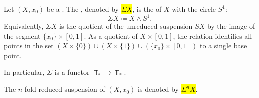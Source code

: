 \begin{definition} \label{definition:reduced_suspension_of_a_pointed_topological_space}
    Let $(X, x_0)$ be a . The , denoted by \hl{$\Sigma X$}, is the  of $X$ with the circle $S^1$:
    \[
    \Sigma X \coloneqq X \wedge S^1.
    \]
    Equivalently, $\Sigma X$ is the quotient of the unreduced suspension $SX$ by the image of the segment $\{x_0\} \times [0,1]$. As a quotient of $X \times [0,1]$, the relation identifies all points in the set $(X \times \{0\}) \cup (X \times \{1\}) \cup (\{x_0\} \times [0,1])$ to a single base point.

    In particular, $\Sigma$ is a functor $\Top_* \to \Top_*$. 

    The $n$-fold reduced suspension of $(X,x_0)$ is denoted by \hl{$\Sigma^n X$}.
\end{definition}